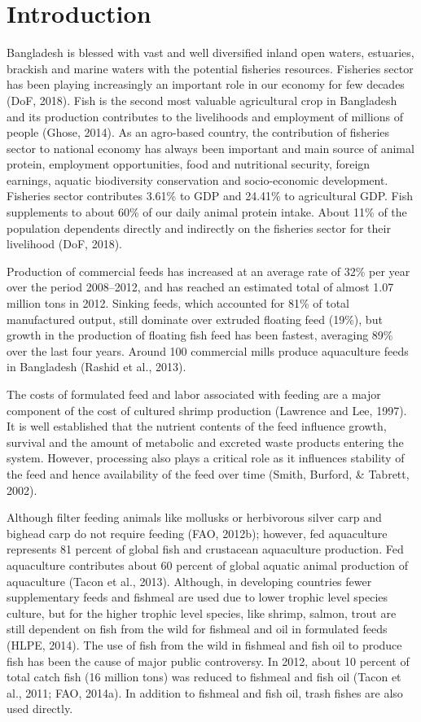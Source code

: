 \documentclass[
]{book}
\begin{document}
\hypertarget{introduction}{%
\chapter{Introduction}\label{introduction}}

Bangladesh is blessed with vast and well diversified inland open waters, estuaries, brackish and
marine waters with the potential fisheries resources. Fisheries sector has been playing increasingly
an important role in our economy for few decades (DoF, 2018). Fish is the second most valuable
agricultural crop in Bangladesh and its production contributes to the livelihoods and employment
of millions of people (Ghose, 2014). As an agro-based country, the contribution of fisheries sector
to national economy has always been important and main source of animal protein, employment
opportunities, food and nutritional security, foreign earnings, aquatic biodiversity conservation
and socio-economic development. Fisheries sector contributes 3.61\% to GDP and 24.41\% to
agricultural GDP. Fish supplements to about 60\% of our daily animal protein intake. About 11\%
of the population dependents directly and indirectly on the fisheries sector for their livelihood
(DoF, 2018).

Production of commercial feeds has increased at an average rate of 32\% per year over the period
2008--2012, and has reached an estimated total of almost 1.07 million tons in 2012. Sinking feeds,
which accounted for 81\% of total manufactured output, still dominate over extruded floating feed
(19\%), but growth in the production of floating fish feed has been fastest, averaging 89\% over the
last four years. Around 100 commercial mills produce aquaculture feeds in Bangladesh (Rashid et
al., 2013).

The costs of formulated feed and labor associated with feeding are a major component of the cost
of cultured shrimp production (Lawrence and Lee, 1997). It is well established that the nutrient
contents of the feed influence growth, survival and the amount of metabolic and excreted waste
products entering the system. However, processing also plays a critical role as it influences
stability of the feed and hence availability of the feed over time (Smith, Burford, \& Tabrett, 2002).

Although filter feeding animals like mollusks or herbivorous silver carp and bighead carp do not
require feeding (FAO, 2012b); however, fed aquaculture represents 81 percent of global fish and
crustacean aquaculture production. Fed aquaculture contributes about 60 percent of global aquatic
animal production of aquaculture (Tacon et al., 2013). Although, in developing countries fewer
supplementary feeds and fishmeal are used due to lower trophic level species culture, but for the
higher trophic level species, like shrimp, salmon, trout are still dependent on fish from the wild for fishmeal and oil in formulated feeds (HLPE, 2014). The use of fish from the wild in fishmeal and
fish oil to produce fish has been the cause of major public controversy. In 2012, about 10 percent
of total catch fish (16 million tons) was reduced to fishmeal and fish oil (Tacon et al., 2011; FAO,
2014a). In addition to fishmeal and fish oil, trash fishes are also used directly.
\end{document}
